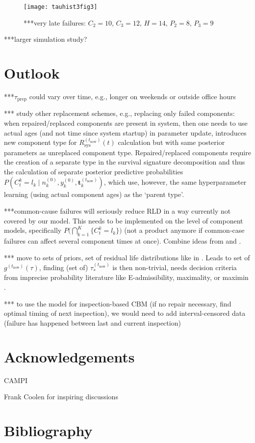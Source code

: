 \documentclass[authoryear]{elsarticle}
\renewcommand{\vec}[1]{{\bm#1}}
\newcommand{\uz}{^{(0)}} %
\def\ykz{y\uz_k}
\def\nkz{n\uz_k}
\def\tnow{t_\text{now}}
\newcommand{\Rsysnow}{R^{(t_\text{now})}_\text{sys}}
\def\vectknow{\vec{t}_k^{(\tnow)}}
\newcommand{\gnow}{g^{(\tnow)}}
\newcommand{\tausnow}{\tau_*^{(\tnow)}}
\newcommand{\tprep}{\tau_{\text{prep}}}
\begin{document}
\begin{figure}
\texttt{[image: tauhist3fig3]}
\caption{***very late failures: $C_2 = 10$, $C_3 = 12$, $H = 14$, $P_2 = 8$, $P_3 = 9$}
\label{fig:tauhist3fig3}
\end{figure}


***larger simulation study?


\section{Outlook}
\label{sec:outlook}

***$\tprep$ could vary over time, e.g., longer on weekends or outside office hours

*** study other replacement schemes, e.g., replacing only failed components:
when repaired/replaced components are present in system,
then one needs to use actual ages (and not time since system startup) in parameter update,
introduces new component type for $\Rsysnow(t)$ calculation but with same posterior parameters as unreplaced component type.
Repaired/replaced components require the creation of a separate type in the survival signature decomposition
and thus the calculation of separate posterior predictive probabilities
$P(C^k_t = l_k \mid \nkz,\ykz,\vectknow)$,
which use, however, the same hyperparameter learning (using actual component ages) as the `parent type'.

***common-cause failures will seriously reduce RLD in a way currently not covered by our model.
This needs to be implemented on the level of component models,
specifically $P\Big( \bigcap_{k=1}^K \{ C^k_t = l_k\} \Big)$ 
(not a product anymore if common-case failures can affect several component times at once).
Combine ideas from \cite{2015:coolen-coolen-maturi} and \cite{Troffaes2014a}.

*** move to sets of priors, set of residual life distributions like in \cite{2016:walter-coolen}.
Leads to set of $\gnow(\tau)$, finding (set of) $\tausnow$ is then non-trivial,
needs decision criteria from imprecise probability literature like E-admissibility, maximality, or maximin
\citep[see, e.g., \S 9***][]{itip}.

*** to use the model for inspection-based CBM (if no repair necessary, find optimal timing of next inspection),
we would need to add interval-censored data (failure has happened between last and current inspection)




\section*{Acknowledgements}

CAMPI

Frank Coolen for inspiring discussions

\section*{Bibliography}




\end{document}
